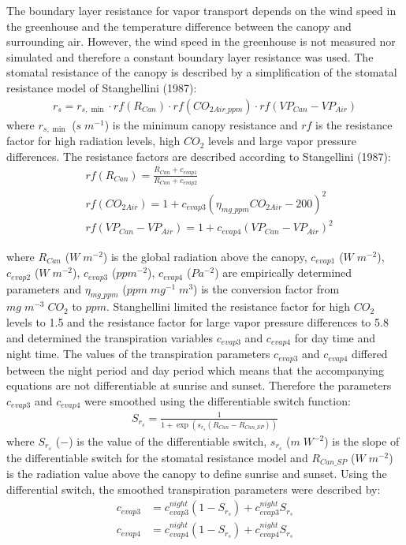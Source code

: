 \documentclass[a4paper]{article}
\begin{document}
The boundary layer resistance for vapor transport depends on the wind speed in the greenhouse and the temperature difference between the canopy and surrounding air\cite{stanghellini1987transpiration}.
However, the wind speed in the greenhouse is not measured nor simulated and therefore a constant boundary layer resistance was used.
The stomatal resistance of the canopy is described by a simplification of the stomatal resistance model of Stanghellini (1987):
\begin{align}
  r_s = r_{s,\min} \cdot rf(R_{Can}) \cdot rf(CO_{2Air\_ppm}) \cdot rf(VP_{Can} - VP_{Air})
\end{align}
where \(r_{s,\min}\) (\(s\;m^{-1}\)) is the minimum canopy resistance and \(rf\) is the resistance factor for high radiation levels, high \(CO_2\) levels and large vapor pressure differences.
The resistance factors are described according to Stangellini (1987):
\begin{equation}
  \begin{split}
    & rf(R_{Can}) = \frac{R_{Can} + c_{evap1}}{R_{Can} + c_{evap2}} \\
    & rf(CO_{2Air}) = 1 + {c_{evap3} (\eta_{mg\_ppm} CO_{2Air} - 200)}^2 \\
    & rf(VP_{Can} - VP_{Air}) = 1 + {c_{evap4} (VP_{Can} - VP_{Air})}^2
  \end{split}
\end{equation}

where \(R_{Can}\) (\(W\;m^{-2}\)) is the global radiation above the canopy, \(c_{evap1}\) (\(W\;m^{-2}\)), \(c_{evap2}\) (\(W\;m^{-2}\)), \(c_{evap3}\) (\(ppm^{-2}\)), \(c_{evap4}\) (\(Pa^{-2}\)) are empirically determined parameters and \(\eta_{mg\_ppm}\) (\(ppm\;mg^{-1}\;m^3\)) is the conversion factor from \(mg\;m^{-3}\;CO_2\) to \(ppm\).
Stanghellini limited the resistance factor for high \(CO_2\) levels to 1.5 and the resistance factor for large vapor pressure differences to 5.8 and determined the transpiration variables \(c_{evap3}\) and \(c_{evap4}\) for day time and night time.
The values of the transpiration parameters \(c_{evap3}\) and \(c_{evap4}\) differed between the night period and day period which means that the accompanying equations are not differentiable at sunrise and sunset. Therefore the parameters \(c_{evap3}\) and \(c_{evap4}\) were smoothed using the differentiable switch function:
\begin{align}
  S_{r_s} = \frac{1}{1 + \exp \left(s_{r_s} (R_{Can} - R_{Can\_SP})\right)}
\end{align}
where \(S_{r_s}\) (\(-\)) is the value of the differentiable switch, \(s_{r_s}\) (\(m\;W^{-2}\)) is the slope of the differentiable switch for the stomatal resistance model and \(R_{Can\_SP}\) (\(W\;m^{-2}\)) is the radiation value above the canopy to define sunrise and sunset.
Using the differential switch, the smoothed transpiration parameters were described by:
\begin{align}
  c_{evap3} & = c_{evap3}^{night} (1 - S_{r_s}) + c_{evap3}^{night} S_{r_s} \\
  c_{evap4} & = c_{evap4}^{night} (1 - S_{r_s}) + c_{evap4}^{night} S_{r_s}
\end{align}
\end{document}
